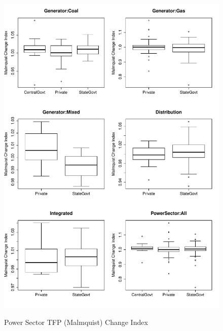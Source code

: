 \begin{figure}[ht]
	\centering
	\caption{Power Sector TFP (Malmquist) Change Index}
		\includegraphics[width=1.00\textwidth]{chapter03/MalmIndex.pdf}	
	\label{fig:MalmIndex}
\end{figure}

